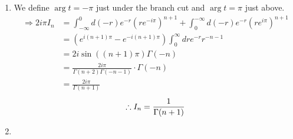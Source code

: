 \item

\begin{enumerate}[wide, labelindent = 0pt, label = (\alph*)]
\item
We define $\arg t = -\pi$ just under the branch cut and $\arg t = \pi$ just above.
\begin{align*}
    \Rightarrow 2i\pi I_n
    &= \int_{-\infty}^0 d\left( -r \right) e^{-r} {\left( r e^{-i\pi} \right)}^{n + 1}
     + \int_0^{-\infty} d\left( -r \right) e^{-r} {\left( r e^{i\pi} \right)}^{n + 1} \\
    &= \left(
        e^{i(n + 1)\pi} - e^{-i(n + 1)\pi}
    \right) \int_0^\infty dr e^{-r} r^{-n-1} \\
    &= 2i\sin ((n + 1) \pi) \Gamma(-n) \\
    &= \frac{2i\pi}{\Gamma(n + 2) \Gamma(-n-1)} \cdot \Gamma(-n) \\
    &= \frac{2i\pi}{\Gamma(n + 1)}
\end{align*}
\[
    \therefore I_n = \frac{1}{\Gamma(n + 1)}
\]

\item
\notyet

\end{enumerate}